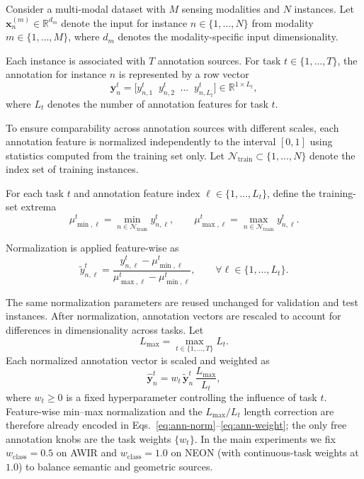 \documentclass[lettersize,journal]{IEEEtran}
\begin{document}
Consider a multi-modal dataset with $M$ sensing modalities and $N$ instances.
Let $\mathbf{x}_n^{(m)} \in \mathbb{R}^{d_m}$ denote the input for instance
$n \in \{1,\dots,N\}$ from modality $m \in \{1,\dots,M\}$, where $d_m$
denotes the modality-specific input dimensionality.

Each instance is associated with $T$ annotation sources.
For task $t \in \{1,\dots,T\}$, the annotation for instance $n$ is represented
by a row vector
\[
\mathbf{y}^{t}_{n}
=
\big[
y^{t}_{n,1}\;\; y^{t}_{n,2}\;\; \dots\;\; y^{t}_{n,L_t}
\big]
\in \mathbb{R}^{1 \times L_t},
\]
where $L_t$ denotes the number of annotation features for task $t$.

To ensure comparability across annotation sources with different scales,
each annotation feature is normalized independently to the interval $[0,1]$
using statistics computed from the training set only.
Let $\mathcal{N}_{\mathrm{train}} \subset \{1,\dots,N\}$ denote the index set of
training instances.

For each task $t$ and annotation feature index $\ell \in \{1,\dots,L_t\}$, define the
training-set extrema
\[
\mu^{t}_{\min,\ell}
=
\min_{n \in \mathcal{N}_{\mathrm{train}}} y^{t}_{n,\ell},
\qquad
\mu^{t}_{\max,\ell}
=
\max_{n \in \mathcal{N}_{\mathrm{train}}} y^{t}_{n,\ell}.
\]

\noindent Normalization is applied feature-wise as
\begin{equation}
\label{eq:ann-norm}
\tilde{y}^{t}_{n,\ell}
=
\frac{
y^{t}_{n,\ell}
-
\mu^{t}_{\min,\ell}
}{
\mu^{t}_{\max,\ell}
-
\mu^{t}_{\min,\ell}
},
\qquad
\forall \ell \in \{1,\dots,L_t\}.
\end{equation}

\noindent The same normalization parameters are reused unchanged for validation and test instances. After normalization, annotation vectors are rescaled to account for differences in dimensionality across tasks.
Let
\[
L_{\max} = \max_{t \in \{1,\dots,T\}} L_t .
\]
Each normalized annotation vector is scaled and weighted as
\begin{equation}
\label{eq:ann-weight}
\hat{\mathbf{y}}^{t}_{n}
=
w_t \, \tilde{\mathbf{y}}^{t}_{n}\, \frac{L_{\max}}{L_t},
\end{equation}
where $w_t \ge 0$ is a fixed hyperparameter controlling the influence of task $t$. Feature-wise min--max normalization and the $L_{\max}/L_t$ length correction are therefore already encoded in Eqs.~\eqref{eq:ann-norm}--\eqref{eq:ann-weight}; the only free annotation knobs are the task weights $\{w_t\}$. In the main experiments we fix $w_{\text{class}}{=}0.5$ on AWIR and $w_{\text{class}}{=}1.0$ on NEON (with continuous-task weights at $1.0$) to balance semantic and geometric sources.
\end{document}
